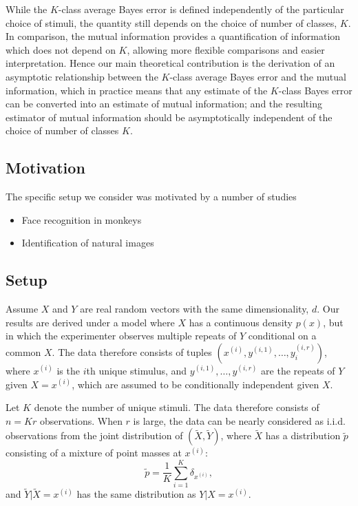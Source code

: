 \documentclass[12pt]{article}
\begin{document}
While the $K$-class average Bayes error is defined independently of the particular choice of stimuli,
the quantity still depends on the choice of number of classes, $K$.
In comparison, the mutual information provides a quantification of information which does not depend on $K$,
allowing more flexible comparisons and easier interpretation.
Hence our main theoretical contribution is the derivation of an asymptotic relationship between the $K$-class average Bayes error
and the mutual information, which in practice means that any estimate of the $K$-class Bayes error can be converted into an estimate of mutual information;
and the resulting estimator of mutual information should be asymptotically independent of the choice of number of classes $K$.

\subsection{Motivation}

The specific setup we consider was motivated by a number of studies
\begin{itemize}
\item Face recognition in monkeys
\item Identification of natural images
\end{itemize}

\subsection{Setup}

Assume $X$ and $Y$ are real random vectors with the same
dimensionality, $d$.  Our results are derived under a model where $X$
has a continuous density $p(x)$, but in which the experimenter
observes multiple repeats of $Y$ conditional on a common $X$.  The
data therefore consists of tuples $(x^{(i)}, y^{(i, 1)}, \hdots,
y_i^{(i, r)})$, where $x^{(i)}$ is the $i$th unique stimulus, and
$y^{(i, 1)},\hdots, y^{(i, r)}$ are the repeats of $Y$ given $X =
x^{(i)}$, which are assumed to be conditionally independent given $X$.

Let $K$ denote the number of unique stimuli.  The data therefore
consists of $n = Kr$ observations.  When $r$ is large, the data can be
nearly considered as i.i.d. observations from the joint distribution
of $(\tilde{X}, \tilde{Y})$, where $\tilde{X}$ has a distribution
$\tilde{p}$ consisting of a mixture of point masses at $x^{(i)}$:
\[
\tilde{p} = \frac{1}{K}\sum_{i=1}^K \delta_{x^{(i)}},
\]
and $\tilde{Y}|\tilde{X} = x^{(i)}$ has the same distribution as $Y|X
= x^{(i)}$.
\end{document}
